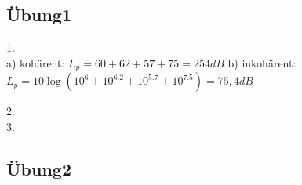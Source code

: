 


\subsection{Übung1}

1.\\
a) kohärent: $L_p = 60+62+57+75 = 254 dB$
b) inkohärent: $L_p = 10 \log(10^{6} + 10^{6.2} + 10^{5.7} + 10^{7.5}) = 75,4 dB$

2.\\


3.\\
\subsection{Übung2}

